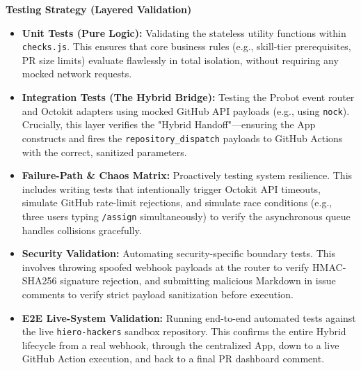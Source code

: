 \documentclass[11pt]{article}
\begin{document}
\vspace{5pt}
\noindent
\textbf{Testing Strategy (Layered Validation)}
\begin{itemize}[leftmargin=18pt,itemsep=2pt,topsep=2pt]
    \item \textbf{Unit Tests (Pure Logic):} Validating the stateless utility functions within \texttt{checks.js}. This ensures that core business rules (e.g., skill-tier prerequisites, PR size limits) evaluate flawlessly in total isolation, without requiring any mocked network requests.
    
    \item \textbf{Integration Tests (The Hybrid Bridge):} Testing the Probot event router and Octokit adapters using mocked GitHub API payloads (e.g., using \texttt{nock}). Crucially, this layer verifies the "Hybrid Handoff"—ensuring the App constructs and fires the \texttt{repository\_dispatch} payloads to GitHub Actions with the correct, sanitized parameters.
    
    \item \textbf{Failure-Path \& Chaos Matrix:} Proactively testing system resilience. This includes writing tests that intentionally trigger Octokit API timeouts, simulate GitHub rate-limit rejections, and simulate race conditions (e.g., three users typing \texttt{/assign} simultaneously) to verify the asynchronous queue handles collisions gracefully.
    
    \item \textbf{Security Validation:} Automating security-specific boundary tests. This involves throwing spoofed webhook payloads at the router to verify HMAC-SHA256 signature rejection, and submitting malicious Markdown in issue comments to verify strict payload sanitization before execution.
    
    \item \textbf{E2E Live-System Validation:} Running end-to-end automated tests against the live \texttt{hiero-hackers} sandbox repository. This confirms the entire Hybrid lifecycle from a real webhook, through the centralized App, down to a live GitHub Action execution, and back to a final PR dashboard comment.
\end{itemize}
\end{document}
